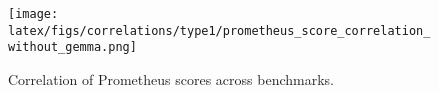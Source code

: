 \begin{figure}[t]
    \centering
    \texttt{[image: latex/figs/correlations/type1/prometheus\_score\_correlation\_without\_gemma.png]}
    \caption{Correlation of Prometheus scores across benchmarks.}
    \label{fig:corr_prometheus}
    \vspace{10px}
\end{figure} 
\begin{comment}
    
\begin{figure*}[h]
    \centering
    \texttt{[image: latex/figs/correlations/type1/word\_perplexity\_score\_correlation\_without\_gemma.png]}
    \caption{Correlation of Word Perplexity scores across benchmarks.}
    \label{fig:corr_prometheus}
    \vspace{10px}
\end{figure*} 

\begin{figure*}[h]
    \centering
    \texttt{[image: latex/figs/correlations/type1/byte\_perplexity\_score\_correlation\_without\_gemma.png]}
    \caption{Correlation of Byte Perplexity scores across benchmarks.}
    \label{fig:corr_byte_perplexity}
    \vspace{10px}
\end{figure*} 

\begin{figure*}[h]
    \centering
    \texttt{[image: latex/figs/correlations/type1/bits\_per\_byte\_score\_correlation\_without\_gemma.png]}
    \caption{Correlation of Bits per Byte scores across benchmarks.}
    \label{fig:corr_bits_per_byte}
    \vspace{10px}
\end{figure*} 
\end{comment}


